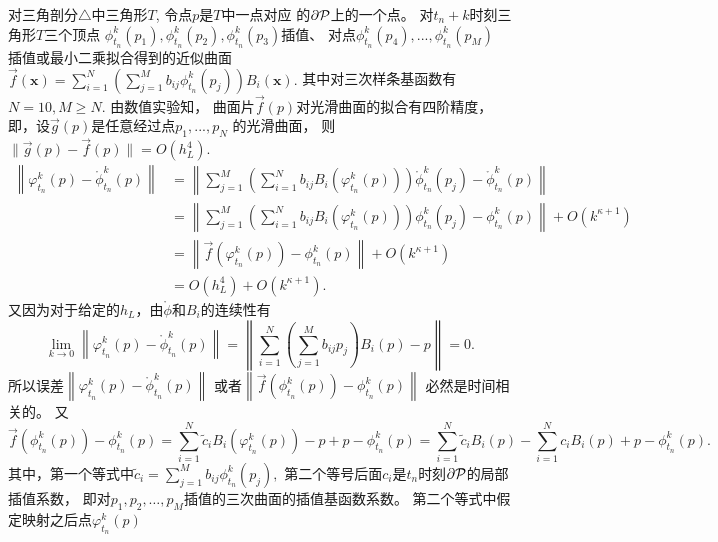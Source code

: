 \begin{pro}
  对三角剖分$\triangle$中三角形$T$,
  令点$p $是$T$中一点对应
  的$ \partial {\cal P}$上的一个点。
  对$t_n+k$时刻三角形$T$三个顶点
  $\phi^k_{t_n}(p_1),\phi^k_{t_n}(p_2),
  \phi^k_{t_n}(p_3)$插值、
  对点$\phi^k_{t_n}(p_4),...,\phi^k_{t_n}(p_M)$
  插值或最小二乘拟合得到的近似曲面
  $\vec{f}(\mathbf{x})=\sum_{i=1}^{N}
  (\sum_{j=1}^Mb_{ij}\phi^k_{t_n}(p_j))B_i(\mathbf{x}).$
  其中对三次样条基函数有$N=10,M\geq N.$
  由数值实验知，
  曲面片$\vec{f}(p)$对光滑曲面的拟合有四阶精度，
  即，设$\vec{g}(p)$是任意经过点$p_1,...,p_N$
  的光滑曲面，%
  则$\lVert \vec{g}(p)-\vec{f}(p)\rVert =O(h_L^4).$
  \begin{equation}
    \label{eq:2}
    \begin{aligned}
   \left\lVert\varphi^k_{t_n}(p)-\mathring{\phi}^k_{t_n}(p)
     \right\rVert &=\left\lVert
     \sum_{j=1}^M\left(\sum_{i=1}^{N}
       b_{ij}B_i\left(\varphi^k_{t_n}(p)\right)\right)
     \mathring{\phi}^k_{t_n}(p_j)
    -\mathring{\phi}^k_{t_n}(p) \right\rVert\\
    &=\left\lVert
      \sum_{j=1}^M\left(\sum_{i=1}^{N}b_{ij}B_i
        \left(\varphi^k_{t_n}(p)\right)\right)
      \phi^k_{t_n}(p_j)-\phi^k_{t_n}(p)\right\rVert
    +O(k^{\kappa+1})\\
    &=\left\lVert
      \vec{f}(\varphi^k_{t_n}(p))-\phi^k_{t_n}(p)\right\rVert
    +O(k^{\kappa+1})\\
    &=O(h_L^4)+O(k^{\kappa+1}).
  \end{aligned}
\end{equation}
又因为对于给定的$h_L$，由$\mathring{\phi}$和$B_i$的连续性有
$$\lim_{k\rightarrow 0}\left\lVert
  \varphi^k_{t_n}(p)-\mathring{\phi}^k_{t_n}(p)
\right\rVert = \left\lVert
  \sum_{i=1}^{N}(\sum_{j=1}^Mb_{ij}p_j)B_i(p)-p\right\rVert=0.$$
所以误差$\left\lVert \varphi^k_{t_n}(p)
-\mathring{\phi}^k_{t_n}(p)\right\rVert$
或者$\left\lVert
      \vec{f}(\phi^k_{t_n}(p))-\phi^k_{t_n}(p)\right\rVert$
必然是时间相关的。
又
\begin{equation}\label{eq:k}
  \vec{f}(\phi^k_{t_n}(p))-\phi^k_{t_n}(p)
    =\sum_{i=1}^{N}\tilde{c}_iB_i\left(\varphi^k_{t_n}(p)\right)
    -p+p-\phi^k_{t_n}(p)
    = \sum_{i=1}^{N}\tilde{c}_iB_i\left(p\right) -\sum_{i=1}^{N}c_iB_i(p)
    +p-\phi^k_{t_n}(p).
\end{equation}
其中，第一个等式中$\tilde{c}_i=\sum_{j=1}^{M}b_{ij}\phi^k_{t_n}(p_j),$
第二个等号后面$c_i$是$t_n$时刻$\partial {\cal P}$的局部插值系数，
即对$p_1,p_2,\ldots,p_M$插值的三次曲面的插值基函数系数。
第二个等式中假定映射之后点$\varphi^k_{t_n}(p)$

\end{pro}
